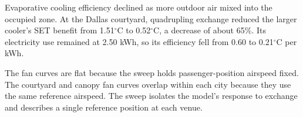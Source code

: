Evaporative cooling efficiency declined as more outdoor air mixed into the occupied zone. At the Dallas courtyard, quadrupling exchange reduced the larger cooler's SET benefit from 1.51\ensuremath{^{\circ}\mathrm{C}} to 0.52\ensuremath{^{\circ}\mathrm{C}}, a decrease of about 65\%. Its electricity use remained at 2.50 kWh, so its efficiency fell from 0.60 to 0.21\ensuremath{^{\circ}\mathrm{C}} per kWh.

The fan curves are flat because the sweep holds passenger-position airspeed fixed. The courtyard and canopy fan curves overlap within each city because they use the same reference airspeed. The sweep isolates the model's response to exchange and describes a single reference position at each venue.
